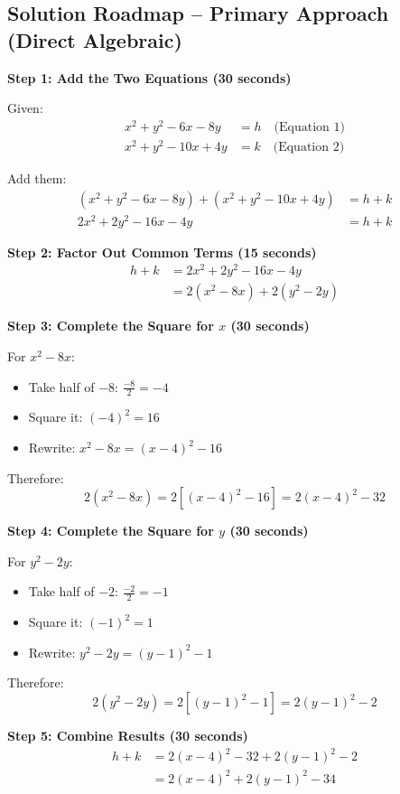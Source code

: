 \documentclass[12pt]{article}
\begin{document}
\begin{solutionbox}
\subsection*{Solution Roadmap -- Primary Approach (Direct Algebraic)}

\textbf{Step 1: Add the Two Equations (30 seconds)}

Given:
\begin{align*}
x^2 + y^2 - 6x - 8y &= h \quad \text{(Equation 1)}\\
x^2 + y^2 - 10x + 4y &= k \quad \text{(Equation 2)}
\end{align*}

Add them:
\begin{align*}
(x^2 + y^2 - 6x - 8y) + (x^2 + y^2 - 10x + 4y) &= h + k\\
2x^2 + 2y^2 - 16x - 4y &= h + k
\end{align*}

\textbf{Step 2: Factor Out Common Terms (15 seconds)}
\begin{align*}
h + k &= 2x^2 + 2y^2 - 16x - 4y\\
&= 2(x^2 - 8x) + 2(y^2 - 2y)
\end{align*}

\textbf{Step 3: Complete the Square for $x$ (30 seconds)}

For $x^2 - 8x$:
\begin{itemize}
    \item Take half of $-8$: $\frac{-8}{2} = -4$
    \item Square it: $(-4)^2 = 16$
    \item Rewrite: $x^2 - 8x = (x - 4)^2 - 16$
\end{itemize}

Therefore:
\[2(x^2 - 8x) = 2[(x - 4)^2 - 16] = 2(x - 4)^2 - 32\]

\textbf{Step 4: Complete the Square for $y$ (30 seconds)}

For $y^2 - 2y$:
\begin{itemize}
    \item Take half of $-2$: $\frac{-2}{2} = -1$
    \item Square it: $(-1)^2 = 1$
    \item Rewrite: $y^2 - 2y = (y - 1)^2 - 1$
\end{itemize}

Therefore:
\[2(y^2 - 2y) = 2[(y - 1)^2 - 1] = 2(y - 1)^2 - 2\]

\textbf{Step 5: Combine Results (30 seconds)}
\begin{align*}
h + k &= 2(x - 4)^2 - 32 + 2(y - 1)^2 - 2\\
&= 2(x - 4)^2 + 2(y - 1)^2 - 34
\end{align*}


\end{solutionbox}
\end{document}
